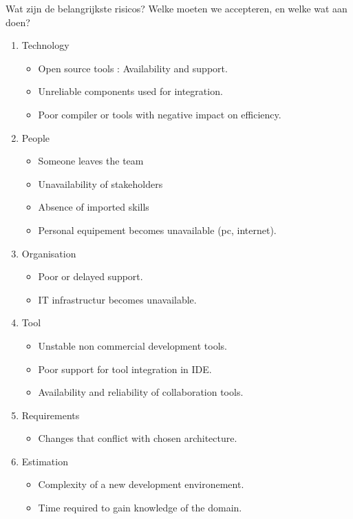 Wat zijn de belangrijkste risicos? Welke moeten we accepteren, en welke wat aan doen?
\begin{enumerate}
	\item Technology
	\begin{itemize}
		\item Open source tools : Availability and support.
		\item Unreliable components used for integration.
		\item Poor compiler or tools with negative impact on efficiency.
	\end{itemize}
	\item People
	\begin{itemize}
		\item Someone leaves the team
		\item Unavailability of stakeholders
		\item Absence of imported skills
		\item Personal equipement becomes unavailable (pc, internet).
	\end{itemize}
	\item Organisation
	\begin{itemize}
		\item Poor or delayed support.
		\item IT infrastructur becomes unavailable.
	\end{itemize}
	\item Tool
	\begin{itemize}
		\item Unstable non commercial development tools.
		\item Poor support for tool integration in IDE.
		\item Availability and reliability of collaboration tools.
	\end{itemize}
	\item Requirements
	\begin{itemize}
		\item Changes that conflict with chosen architecture.
	\end{itemize}
	\item Estimation
	\begin{itemize}
		\item Complexity of a new development environement.
		\item Time required to gain knowledge of the domain.
	\end{itemize}
\end{enumerate}

